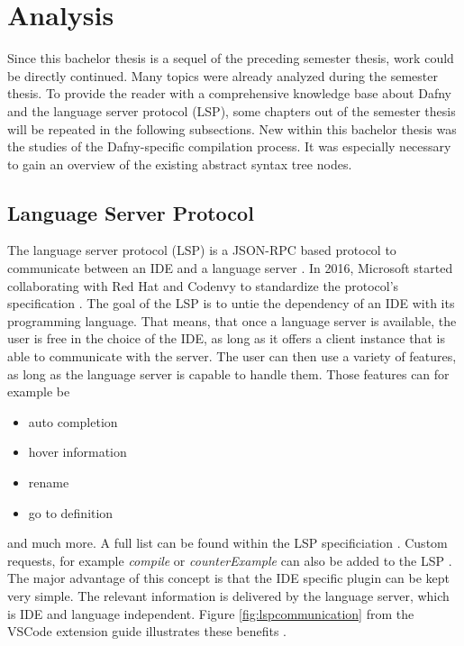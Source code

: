 \section{Analysis}
\label{section:analysis}
Since this bachelor thesis is a sequel of the preceding semester thesis, work could be directly continued.
Many topics were already analyzed during the semester thesis.
To provide the reader with a comprehensive knowledge base about Dafny and the language server protocol (LSP), some chapters out of the semester thesis will be repeated in the following subsections.
New within this bachelor thesis was the studies of the Dafny-specific compilation process.
It was especially necessary to gain an overview of the existing abstract syntax tree nodes.

\subsection{Language Server Protocol}
\label{section:analysis:lsp}
The language server protocol (LSP) is a JSON-RPC based protocol to communicate between an IDE and a language server \cite{lspWiki}.
In 2016, Microsoft started collaborating with Red Hat and Codenvy to standardize the protocol’s specification \cite{lspWiki}.
The goal of the LSP is to untie the dependency of an IDE with its programming language.
That means, that once a language server is available, the user is free in the choice of the IDE, as long as it offers a client instance that is able to communicate with the server.
The user can then use a variety of features, as long as the language server is capable to handle them.
Those features can for example be
\begin{itemize}
    \item auto completion
    \item hover information
    \item rename
    \item go to definition
\end{itemize}
and much more. A full list can be found within the LSP specificiation \cite{lspspec}.
Custom requests, for example \textit{compile} or \textit{counterExample} can also be added to the LSP \cite{lspWiki}.
The major advantage of this concept is that the IDE specific plugin can be kept very simple.
The relevant information is delivered by the language server, which is IDE and language independent.
Figure \ref{fig:lspcommunication} from the VSCode extension guide illustrates these benefits \cite{lspextensionguide}.

